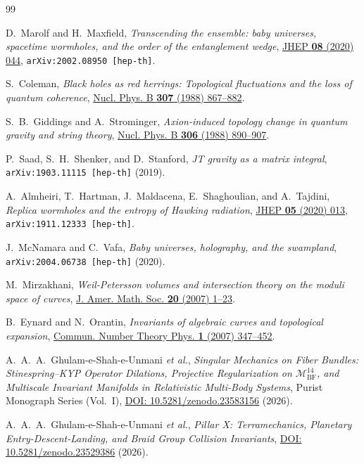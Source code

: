 \documentclass[11pt,a4paper,reqno]{article}
\theoremstyle{plain}
\theoremstyle{definition}
\theoremstyle{remark}
\numberwithin{equation}{section}
\begin{document}
\begin{thebibliography}{99}

D.~Marolf and H.~Maxfield,
\textit{Transcending the ensemble: baby universes, spacetime wormholes, and the order of the entanglement wedge},
\href{https://doi.org/10.1007/JHEP08(2020)044}{JHEP \textbf{08} (2020) 044},
\texttt{arXiv:2002.08950 [hep-th]}.

S.~Coleman,
\textit{Black holes as red herrings: Topological fluctuations and the loss of quantum coherence},
\href{https://doi.org/10.1016/0550-3213(88)90110-1}{Nucl. Phys. B \textbf{307} (1988) 867--882}.

S.~B.~Giddings and A.~Strominger,
\textit{Axion-induced topology change in quantum gravity and string theory},
\href{https://doi.org/10.1016/0550-3213(88)90446-4}{Nucl. Phys. B \textbf{306} (1988) 890--907}.

P.~Saad, S.~H.~Shenker, and D.~Stanford,
\textit{JT gravity as a matrix integral},
\texttt{arXiv:1903.11115 [hep-th]} (2019).

A.~Almheiri, T.~Hartman, J.~Maldacena, E.~Shaghoulian, and A.~Tajdini,
\textit{Replica wormholes and the entropy of Hawking radiation},
\href{https://doi.org/10.1007/JHEP05(2020)013}{JHEP \textbf{05} (2020) 013},
\texttt{arXiv:1911.12333 [hep-th]}.

J.~McNamara and C.~Vafa,
\textit{Baby universes, holography, and the swampland},
\texttt{arXiv:2004.06738 [hep-th]} (2020).

M.~Mirzakhani,
\textit{Weil-Petersson volumes and intersection theory on the moduli space of curves},
\href{https://doi.org/10.1090/S0894-0347-06-00526-1}{J. Amer. Math. Soc. \textbf{20} (2007) 1--23}.

B.~Eynard and N.~Orantin,
\textit{Invariants of algebraic curves and topological expansion},
\href{https://doi.org/10.4310/CNTP.2007.v1.n2.a4}{Commun. Number Theory Phys. \textbf{1} (2007) 347--452}.

A.~A.~A.~Ghulam-e-Shah-e-Unmani \textit{et al.},
\textit{Singular Mechanics on Fiber Bundles: Stinespring--KYP Operator Dilations, Projective Regularization on $\mathcal{M}_{\mathrm{BF}}^{14}$, and Multiscale Invariant Manifolds in Relativistic Multi-Body Systems},
Purist Monograph Series (Vol.~I),
\href{https://doi.org/10.5281/zenodo.23583156}{DOI: 10.5281/zenodo.23583156} (2026).

A.~A.~A.~Ghulam-e-Shah-e-Unmani \textit{et al.},
\textit{Pillar X: Terramechanics, Planetary Entry-Descent-Landing, and Braid Group Collision Invariants},
\href{https://doi.org/10.5281/zenodo.23529386}{DOI: 10.5281/zenodo.23529386} (2026).

\end{thebibliography}
\end{document}
